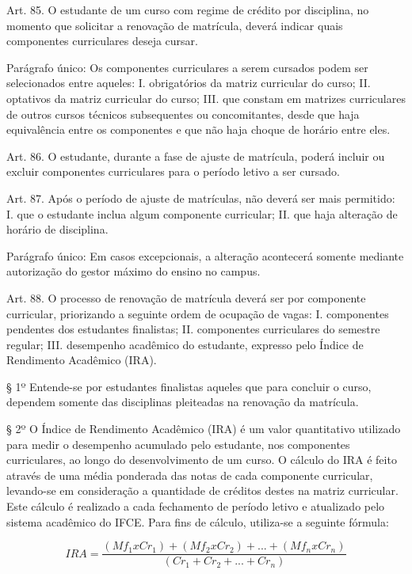 {Art. 85. O estudante de um curso com regime de crédito por disciplina, no momento que solicitar a renovação de matrícula, deverá indicar quais componentes curriculares deseja cursar.

Parágrafo único: Os componentes curriculares a serem cursados podem ser selecionados entre aqueles:
I. obrigatórios da matriz curricular do curso;
II. optativos da matriz curricular do curso;
III. que constam em matrizes curriculares de outros cursos técnicos subsequentes ou concomitantes, desde que haja equivalência entre os componentes e que não haja choque de horário entre eles.

Art. 86. O estudante, durante a fase de ajuste de matrícula, poderá incluir ou excluir componentes curriculares para o período letivo a ser cursado.

Art. 87. Após o período de ajuste de matrículas, não deverá ser mais permitido:
I. que o estudante inclua algum componente curricular;
II. que haja alteração de horário de disciplina.

Parágrafo único: Em casos excepcionais, a alteração acontecerá somente mediante autorização do gestor máximo do ensino no campus.

Art. 88. O processo de renovação de matrícula deverá ser por componente curricular, priorizando a seguinte ordem de ocupação de vagas:
I. componentes pendentes dos estudantes finalistas;
II. componentes curriculares do semestre regular;
III. desempenho acadêmico do estudante, expresso pelo Índice de Rendimento Acadêmico (IRA).

§ 1º Entende-se por estudantes finalistas aqueles que para concluir o curso, dependem somente das disciplinas pleiteadas na renovação da matrícula.

§ 2º O Índice de Rendimento Acadêmico (IRA) é um valor quantitativo utilizado para medir o desempenho acumulado pelo estudante, nos componentes curriculares, ao longo do desenvolvimento de um curso. O cálculo do IRA é feito através de uma média ponderada das notas de cada componente curricular, levando-se em consideração a quantidade de créditos destes na matriz curricular. Este cálculo é realizado a cada fechamento de período letivo e atualizado pelo sistema acadêmico do IFCE. Para fins de cálculo, utiliza-se a seguinte fórmula:

\begin{equation*}
	IRA=\frac{(Mf_1 x Cr_1)+(Mf_2 x Cr_2)+...+(Mf_n x Cr_n)}{(Cr_1+Cr_2+...+Cr_n)}
\end{equation*}
\vspace{0,3cm}

}
